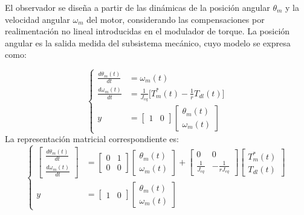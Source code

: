 \documentclass[blue,fullpaper]{ludusofficial}  %
\begin{document}
El observador se diseña a partir de las dinámicas de la posición angular $\theta_{m}$ y la velocidad angular $\omega_{m}$ del motor, considerando las compensaciones por realimentación no lineal introducidas en el modulador de torque. La posición angular es la salida medida del subsistema mecánico, cuyo modelo se expresa como:

\[
\left\{
\begin{aligned}
\frac{d \theta_{m}(t) }{dt} & = \omega_{m}(t) \\
\frac{d \omega_{m}(t) }{dt} & = \frac{1}{J_{eq}} \Big[ T_{m}^{*}(t)-\frac{1}{r}T_{dl}(t) \Big] \\
y & = \begin{bmatrix} 1 & 0 \end{bmatrix} \begin{bmatrix} \theta_{m}(t) \\ \omega_{m}(t) \end{bmatrix}
\end{aligned}
\right.
\]
La representación matricial correspondiente es:
\begin{equation}
\label{eq:planta-observador}
\left\{
\begin{aligned}
\begin{bmatrix} \frac{d \theta_{m}(t) }{dt} \\ \frac{d \omega_{m}(t) }{dt}  \end{bmatrix} 
 & = \begin{bmatrix} 0 & 1 \\0 & 0 \end{bmatrix} \begin{bmatrix} \theta_{m}(t) \\ \omega_{m}(t) \end{bmatrix} + \begin{bmatrix} 0 & 0 \\ \frac{1}{J_{eq}} & -\frac{1}{rJ_{eq}} \end{bmatrix} \begin{bmatrix} T^{*}_{m}(t) \\ T_{dl}(t) \end{bmatrix} \\
y & = \begin{bmatrix} 1 & 0 \end{bmatrix} \begin{bmatrix} \theta_{m}(t) \\ \omega_{m}(t) \end{bmatrix}
\end{aligned}
\right.
\end{equation}
\end{document}
